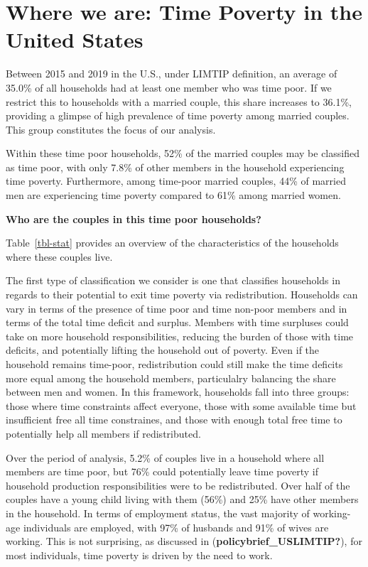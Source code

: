 \documentclass[
  11pt,
]{article}
\begin{document}
\section{Where we are: Time Poverty in the United
States}\label{where-we-are-time-poverty-in-the-united-states}

Between 2015 and 2019 in the U.S., under LIMTIP definition, an average
of 35.0\% of all households had at least one member who was time poor.
If we restrict this to households with a married couple, this share
increases to 36.1\%, providing a glimpse of high prevalence of time
poverty among married couples. This group constitutes the focus of our
analysis.

Within these time poor households, 52\% of the married couples may be
classified as time poor, with only 7.8\% of other members in the
household experiencing time poverty. Furthermore, among time-poor
married couples, 44\% of married men are experiencing time poverty
compared to 61\% among married women.

\textbf{Who are the couples in this time poor households?}

Table~\ref{tbl-stat} provides an overview of the characteristics of the
households where these couples live.

The first type of classification we consider is one that classifies
households in regards to their potential to exit time poverty via
redistribution. Households can vary in terms of the presence of time
poor and time non-poor members and in terms of the total time deficit
and surplus. Members with time surpluses could take on more household
responsibilities, reducing the burden of those with time deficits, and
potentially lifting the household out of poverty. Even if the household
remains time-poor, redistribution could still make the time deficits
more equal among the household members, particulalry balancing the share
between men and women. In this framework, households fall into three
groups: those where time constraints affect everyone, those with some
available time but insufficient free all time constraines, and those
with enough total free time to potentially help all members if
redistributed.

Over the period of analysis, 5.2\% of couples live in a household where
all members are time poor, but 76\% could potentially leave time poverty
if household production responsibilities were to be redistributed. Over
half of the couples have a young child living with them (56\%) and 25\%
have other members in the household. In terms of employment status, the
vast majority of working-age individuals are employed, with 97\% of
husbands and 91\% of wives are working. This is not surprising, as
discussed in (\textbf{policybrief\_USLIMTIP?}), for most individuals,
time poverty is driven by the need to work.
\end{document}
